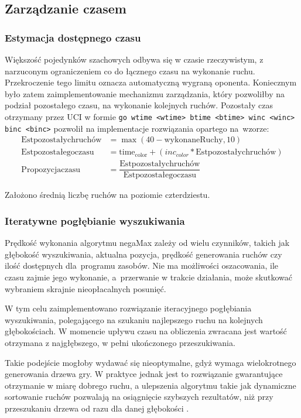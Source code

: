 \subsection{Zarządzanie czasem}
\label{subsec:zarzadzanie-czasem}
\subsubsection{Estymacja dostępnego czasu}
Większość pojedynków szachowych odbywa się w czasie rzeczywistym, z narzuconym ograniczeniem co do łącznego czasu na wykonanie ruchu.
Przekroczenie tego limitu oznacza automatyczną wygraną oponenta.
Koniecznym było zatem zaimplementowanie mechanizmu zarządzania, który pozwoliłby na podział pozostałego czasu, na wykonanie kolejnych ruchów.
Pozostały czas otrzymany przez UCI w formie \texttt{go wtime <wtime> btime <btime> winc <winc> binc <binc>} pozwolił na implementacje rozwiązania opartego na~wzorze:
\begin{align*}
    \mathrm{Est pozostałych ruchów} &= {\max(40 - \mathrm{wykonaneRuchy}, 10)} \\
    \mathrm{Est pozostałego czasu} &= \mathrm{time_{color}} + (inc_{color} * \mathrm{Est pozostałych ruchów}) \\
    \mathrm{Propozycja czasu} &= \dfrac{\mathrm{Est pozostałych ruchów}}{\mathrm{Est pozostałego czasu}}
\end{align*}

Założono średnią liczbę ruchów na poziomie czterdziestu.

\subsubsection{Iteratywne pogłębianie wyszukiwania}
Prędkość wykonania algorytmu negaMax zależy od wielu czynników, takich jak głębokość wyszukiwania, aktualna pozycja, prędkość generowania ruchów czy ilość dostępnych dla~programu zasobów.
Nie ma możliwości oszacowania, ile czasu zajmie jego wykonanie, a~przerwanie w trakcie działania, może skutkować wybraniem skrajnie nieopłacalnych posunięć.

W tym celu zaimplementowano rozwiązanie iteracyjnego pogłębiania wyszukiwania, polegającego na szukaniu najlepszego ruchu na kolejnych głębokościach.
W momencie upływu czasu na obliczenia zwracana jest wartość otrzymana z najgłębszego, w pełni ukończonego przeszukiwania.

Takie podejście mogłoby wydawać się nieoptymalne, gdyż wymaga wielokrotnego generowania drzewa gry.
W praktyce jednak jest to rozwiązanie gwarantujące otrzymanie w miarę dobrego ruchu, a ulepszenia algorytmu takie jak dynamiczne sortowanie ruchów pozwalają na osiągnięcie szybszych rezultatów, niż przy przeszukaniu drzewa od razu dla danej głębokości \cite*{wiki-deepening}.